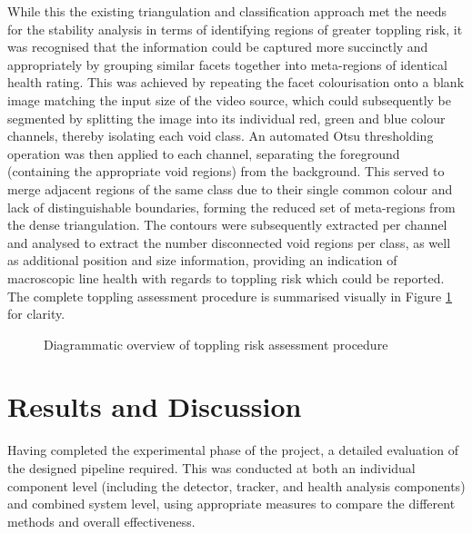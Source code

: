 \documentclass[10pt]{article}
\begin{document}
While this the existing triangulation and classification approach met the needs for the stability analysis in terms of identifying regions of greater toppling risk, it was recognised that the information could be captured more succinctly and appropriately by grouping similar facets together into meta-regions of identical health rating. This was achieved by repeating the facet colourisation onto a blank image matching the input size of the video source, which could subsequently be segmented by splitting the image into its individual red, green and blue colour channels, thereby isolating each void class. An automated Otsu thresholding operation was then applied to each channel, separating the foreground (containing the appropriate void regions) from the background. This served to merge adjacent regions of the same class due to their single common colour and lack of distinguishable boundaries, forming the reduced set of meta-regions from the dense triangulation. The contours were subsequently extracted per channel and analysed to extract the number disconnected void regions per class, as well as additional position and size information, providing an indication of macroscopic line health with regards to toppling risk which could be reported. The complete toppling assessment procedure is summarised visually in Figure \ref{fig:toppling_analysis} for clarity.

\vfill
\begin{figure}[hbt]
\centering
{}%
\caption{Diagrammatic overview of toppling risk assessment procedure}
\label{fig:toppling_analysis}
\end{figure}
\vfill

\clearpage
\section{Results and Discussion}
Having completed the experimental phase of the project, a detailed evaluation of the designed pipeline required. This was conducted at both an individual component level (including the detector, tracker, and health analysis components) and combined system level, using appropriate measures to compare the different methods and overall effectiveness. 
\end{document}
